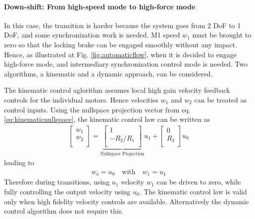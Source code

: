 \paragraph{Down-shift: From high-speed mode to high-force mode}
In this case, the transition is harder because the system goes from 2 DoF to 1 DoF, and some synchronization work is needed. M1 speed $w_1$ must be brought to zero so that the locking brake can be engaged smoothly without any impact. Hence, as illustrated at Fig. \ref{fig:automaticflow}, when it is decided to engage high-force mode, and intermediary synchronization control mode is needed. Two algorithms, a kinematic and a dynamic approach, can be considered. 

The kinematic control aglorithm assumes local high gain velocity feedback controls for the individual motors. Hence velocities $w_1$ and $w_2$ can be treated as control inputs. Using the nullspace projection vector from eq.\eqref{eq:kinematicnullspace}, the kinematic control law can be written as 
%
\begin{align}
\left[
\begin{array}{c}
w_1 \\
w_2 \\
\end{array}
\right]=
\underbrace{\left[
\begin{array}{c}
1 \\
-R_2/R_1 \\
\end{array}
\right]}_{\text{Nullspace Projection}}
u_1 + 
\left[
\begin{array}{c}
0 \\
R_2 \\
\end{array}
\right] u_0
\label{eq:kinematicsys}
\end{align}
%
leading to
%
\begin{align}
w_o = u_0 \quad \text{with} \quad w_1 = u_1
\end{align}
%
Therefore during transitions, using $u_1$ velocity $w_1$ can be driven to zero, while fully controlling the output velocity using $u_0$. The kinematic control law is valid only when high fidelity velocity controls are available. Alternatively the dynamic control algorithm does not require this. 

